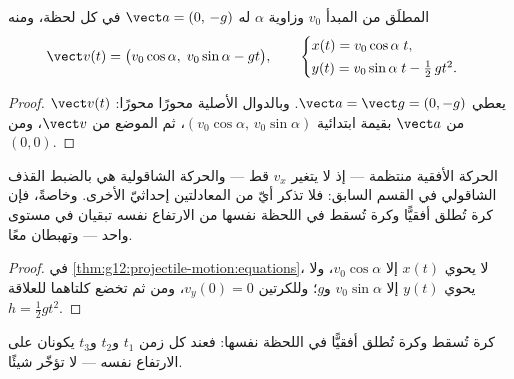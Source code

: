 \begin{theorem}\label{thm:g12:projectile-motion:equations}
 المطلَق من المبدأ  $v_0$ وزاوية $\alpha$
له $\vect a = (0,\,-g)$ في كل لحظة، ومنه
\[
\vect v(t) = \bigl(v_0\cos\alpha,\; v_0\sin\alpha - g t\bigr),
\qquad
\begin{cases}
x(t) = v_0\cos\alpha\; t,\\[2pt]
y(t) = v_0\sin\alpha\; t - \tfrac12\, g t^2 .
\end{cases}
\]
\end{theorem}

\begin{proof}
يعطي  $\vect a = \vect g = (0,-g)$. وبالدوال الأصلية
محورًا محورًا: $\vect v(t)$ من $\vect a$ بقيمة ابتدائية
$(v_0\cos\alpha,\, v_0\sin\alpha)$، ثم الموضع من $\vect v$، ومن $(0,0)$.
\end{proof}

\begin{proposition}\label{prop:g12:projectile-motion:independence}
الحركة الأفقية منتظمة --- إذ لا يتغير $v_x$ قط --- والحركة
الشاقولية هي بالضبط القذف الشاقولي في القسم السابق:
فلا تذكر أيّ من المعادلتين إحداثيّ الأخرى. وخاصةً، فإن كرة
تُطلق أفقيًّا وكرة تُسقط في اللحظة نفسها من الارتفاع
نفسه تبقيان في مستوى واحد --- وتهبطان معًا.
\end{proposition}

\begin{proof}
في \cref{thm:g12:projectile-motion:equations}، لا يحوي $x(t)$ إلا
$v_0\cos\alpha$، ولا يحوي $y(t)$ إلا $v_0\sin\alpha$ و$g$؛ وللكرتين
$v_y(0) = 0$، ومن ثم تخضع كلتاهما للعلاقة $h = \tfrac12 gt^2$.
\end{proof}

\begin{omfigure}

{\small كرة تُسقط وكرة تُطلق أفقيًّا في اللحظة نفسها: فعند
كل زمن $t_1$ و$t_2$ و$t_3$ يكونان على الارتفاع نفسه ---  لا تؤخّر شيئًا.}
\end{omfigure}

